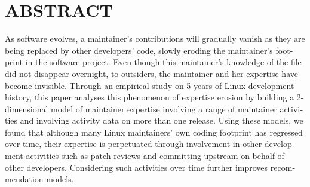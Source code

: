 %

\chapter*{ABSTRACT}\thispagestyle{headings}
%
\begin{otherlanguage}{english}



As software evolves, a maintainer's contributions will gradually vanish as they are being replaced by other developers' code, slowly eroding the maintainer's footprint in the software project. Even though this maintainer's knowledge of the file did not disappear overnight, to outsiders, the maintainer and her expertise have become invisible. Through an empirical study on 5 years of Linux development history, this paper analyses this phenomenon of expertise erosion by building a 2-dimensional model of maintainer expertise involving a range of maintainer activities and involving activity data on more than one release. Using these models, we found that although many Linux maintainers' own coding footprint has regressed over time, their expertise is perpetuated through involvement in other development activities such as patch reviews and committing upstream on behalf of other developers. Considering such activities over time further improves recommendation models.

\end{otherlanguage}
